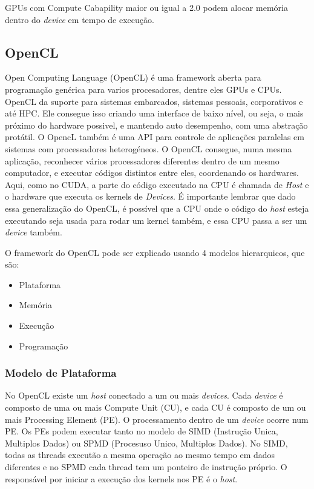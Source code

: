 GPUs com Compute Cabapility maior ou igual a 2.0 podem alocar memória dentro do \textit{device} em tempo de execução.

\subsection{OpenCL}
Open Computing Language (OpenCL) é uma framework aberta para programação genérica para varios procesadores, dentre eles GPUs e CPUs.
OpenCL da suporte para sistemas embarcados, sistemas pessoais, corporativos e até HPC. Ele consegue isso criando uma interface
de baixo nível, ou seja, o mais próximo do hardware possivel, e mantendo auto desempenho, com uma abstração protátil. O OpencL
também é uma API para controle de aplicações paralelas em sistemas com processadores heterogéneos. O OpenCL consegue, numa mesma
aplicação, reconhecer vários processadores diferentes dentro de um mesmo computador, e executar códigos distintos entre eles,
coordenando os hardwares. Aqui, como no CUDA, a parte do código executado na CPU é chamada de \textit{Host} e o hardware
que executa os kernels de \textit{Devices}. É importante lembrar que dado essa generalização do OpenCL, é possível que a CPU
onde o código do \textit{host} esteja executando seja usada para rodar um kernel também, e essa CPU passa a ser um \textit{device}
também.

O framework do OpenCL pode ser explicado usando 4 modelos hierarquicos, que são:
\begin{itemize}
  \item Plataforma
  \item Memória
  \item Execução
  \item Programação
\end{itemize}

\subsubsection{Modelo de Plataforma}
No OpenCL existe um \textit{host} conectado a um ou mais \textit{devices}. Cada \textit{device} é composto de uma ou mais 
Compute Unit (CU), e cada CU é composto de um ou mais Processing Element (PE). O processamento dentro de um \textit{device}
ocorre num PE. Os PEs podem executar tanto no modelo de SIMD (Instrução Unica, Multiplos Dados) ou SPMD 
(Procesuso Unico, Multiplos Dados). No SIMD, todas as threads executão a mesma operação ao mesmo tempo em dados diferentes
e no SPMD cada thread tem um ponteiro de instrução próprio. O responsável por iniciar a execução dos kernels nos PE é o \textit{host}.

